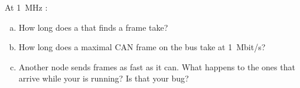 \label{ex:8:5}
At 1~MHz :
\begin{enumerate}[a)]
  \item How long does a  that finds a frame take?
  \item How long does a maximal CAN frame on the bus take at 1~Mbit/s?
  \item Another node sends frames as fast as it can. What happens to the ones that arrive while
    your  is running? Is that your bug?
\end{enumerate}
